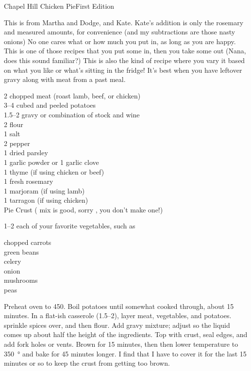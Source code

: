 \begin{entry}{Chapel Hill Chicken Pie}{First Edition}

\begin{open}
  This is from Martha and Dodge, and Kate. Kate's addition is only the
  rosemary and measured amounts, for convenience (and my subtractions are
  those nasty onions) No one cares what or how much you put in, as long as you
  are happy. This is one of those recipes that you put some in, then you take
  some out (Nana, does this sound familiar?) This is also the kind of recipe
  where you vary it based on what you like or what's sitting in the fridge!
  It's best when you have leftover gravy along with meat from a past meal.
\end{open}
\begin{ingredients}
  \SI{2}{\cup} chopped meat (roast lamb, beef, or chicken)\\
  \numrange{3}{4} cubed and peeled potatoes\\
  \SIrange{1.5}{2}{\cup} gravy or combination of stock and wine\\
  \SI{2}{\tblspoon} flour\\
  \SI{1}{\teaspoon} salt\\
  \SI{2}{\teaspoon} pepper\\
  \SI{1}{\tblspoon} dried parsley\\
  \SI{1}{\teaspoon} garlic powder or 1 garlic clove\\
  \SI{1}{\teaspoon} thyme (if using chicken or beef)\\
  \SI{1}{\tblspoon} fresh rosemary \\
  \SI{1}{\teaspoon} marjoram (if using lamb)\\
  \SI{1}{\teaspoon} tarragon (if using chicken)\\
  Pie Crust ( mix is good, sorry
  , you don't make one!)
\end{ingredients}
\SIrange{1}{2}{\cup} each of your favorite vegetables, such as
\begin{ingredients}
  chopped carrots\\
  green beans\\
  celery\\
  onion\\
  mushrooms\\
  peas
\end{ingredients}
Preheat oven to \SI{450}{\degreeF}. Boil potatoes until somewhat cooked through, about
15 minutes. In a flat-ish casserole (\SIrange{1.5}{2}{\quart}), layer meat,
vegetables, and potatoes. sprinkle spices over, and then flour. Add gravy
mixture; adjust so the liquid comes up about half the height of the
ingredients.  Top with crust, seal edges, and add fork holes or vents. Brown
for 15 minutes, then then lower temperature to \SI{350}{\degree} and bake for
45 minutes longer. I find that I have to cover it for the last
15 minutes or so to keep the crust from getting too brown.
\end{entry}

